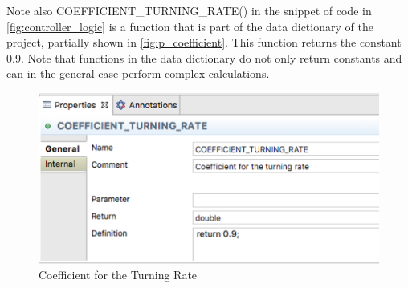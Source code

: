 Note also \textsf{COEFFICIENT\_TURNING\_RATE()}  in the snippet of code in
\fig\ref{fig:controller_logic} is a function that is part of the data dictionary
of the project, partially shown in \fig\ref{fig:p_coefficient}. This function
returns the constant \textsf{0.9}. Note that functions in the data dictionary
do not only return constants and can in the general case perform complex
calculations.

\begin{figure}[!h]
\centering
\includegraphics[width=.7\textwidth]{images/coefficient_turning_rate.png}
\caption{Coefficient for the Turning Rate} 
\label{fig:coefficient_turning_rate}
\end{figure}